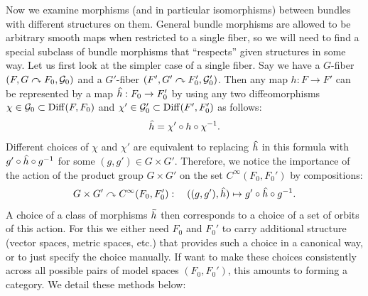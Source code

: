 Now we examine morphisms (and in particular isomorphisms) between bundles with different structures on them. General bundle morphisms are allowed to be arbitrary smooth maps when restricted to a single fiber, so we will need to find a special subclass of bundle morphisms that ``respects'' given structures in some way. Let us first look at the simpler case of a single fiber. Say we have a $G$-fiber $(F,G\curvearrowright F_0,\mathcal{G}_0)$ and a $G'$-fiber $(F',G'\curvearrowright F_0',\mathcal{G}_0')$. Then any map $h:F\to F'$ can be represented by a map $\wh{h}:F_0\to F_0'$ by using any two diffeomorphisms $\chi\in\mathcal{G}_0\subset \operatorname{Diff}(F,F_0)$ and $\chi'\in\mathcal{G}_0'\subset \operatorname{Diff}(F',F_0')$ as follows:
\[\wh{h}=\chi'\circ h\circ \chi^{-1}.\label{eq g-fiber f-hat}\]
Different choices of $\chi$ and $\chi'$ are equivalent to replacing $\wh{h}$ in this formula with $g'\circ \wh{h}\circ g^{-1}$ for some $(g,g')\in G\times G'$. Therefore, we notice the importance of the action of the product group $G\times G'$ on the set $C^\infty(F_0,F_0')$ by compositions:
\[G\times G'\acts C^\infty(F_0,F_0'):\quad ((g,g'),\wh{h})\mapsto g'\circ \wh{h}\circ g^{-1}.\label{eq gg' action}\] 
A choice of a class of morphisms $\wt h$ then corresponds to a choice of a set of orbits of this action. For this we either need $F_0$ and $F_0'$ to carry additional structure (vector spaces, metric spaces, etc.) that provides such a choice in a canonical way, or to just specify the choice manually. If want to make these choices consistently across all possible pairs of model spaces $(F_0,F_0')$, this amounts to forming a category. We detail these methods below:
